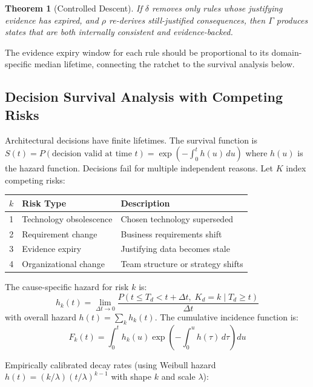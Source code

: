 \documentclass[11pt, a4paper, logo, copyright]{googledeepmind}
\newtheorem{theorem}{Theorem}[section]
\begin{document}
\begin{theorem}[Controlled Descent]
If $\delta$ removes only rules whose justifying evidence has expired, and $\rho$ re-derives still-justified consequences, then $\Gamma$ produces states that are both internally consistent and evidence-backed.
\end{theorem}

The evidence expiry window for each rule should be proportional to its domain-specific median lifetime, connecting the ratchet to the survival analysis below.

\subsection{Decision Survival Analysis with Competing Risks}

Architectural decisions have finite lifetimes. The survival function is $S(t) = P(\text{decision valid at time } t) = \exp\left(-\int_0^t h(u) \, du\right)$ where $h(u)$ is the hazard function. Decisions fail for multiple independent reasons. Let $K$ index competing risks:

\begin{center}
\begin{tabular}{clp{7cm}}
\toprule
$k$ & Risk Type & Description \\
\midrule
1 & Technology obsolescence & Chosen technology superseded \\
2 & Requirement change & Business requirements shift \\
3 & Evidence expiry & Justifying data becomes stale \\
4 & Organizational change & Team structure or strategy shifts \\
\bottomrule
\end{tabular}
\end{center}

The cause-specific hazard for risk $k$ is:
\begin{equation}
    h_k(t) = \lim_{\Delta t \to 0} \frac{P(t \leq T_d < t + \Delta t, \; K_d = k \mid T_d \geq t)}{\Delta t}
\end{equation}
with overall hazard $h(t) = \sum_k h_k(t)$. The cumulative incidence function is:
\begin{equation}
    F_k(t) = \int_0^t h_k(u) \exp\!\left(-\int_0^u h(\tau)\, d\tau\right) du
\end{equation}

Empirically calibrated decay rates (using Weibull hazard $h(t) = (k/\lambda)(t/\lambda)^{k-1}$ with shape $k$ and scale $\lambda$):
\end{document}
